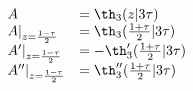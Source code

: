 \begin{equation} 
    \begin{array}{ll}
      A &= \th_3(z|3\tau)\\ 
      A|_{z={1-\tau\over 2}} &= \th_3({1+\tau\over 2}|3\tau)\\ 
      A'|_{z={1-\tau\over 2}} &= -\th_3'({1+\tau\over 2}|3\tau)\\ 
      A''|_{z={1-\tau\over 2}} &=\th_3''({1+\tau\over 2}|3\tau) 
    \end{array} 
\end{equation} 
